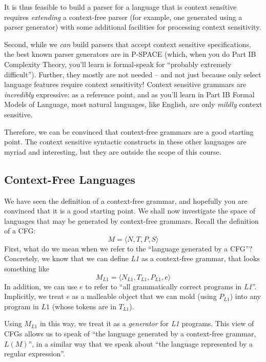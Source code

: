 It is thus feasible to build a parser for a language that is context sensitive requires \textit{extending} a context-free parser (for example, one generated using a parser generator) with some additional facilities for processing context sensitivity. 

Second, while we \textit{can} build parsers that accept context sensitive specifications, the best known parser generators are in \textsf{P-SPACE} (which, when you do \textsf{Part IB Complexity Theory}, you'll learn is formal-speak for ``probably extremely difficult''). Further, they mostly are not needed -- and not just because only select language features require context sensitivity! Context sensitive grammars are \textit{incredibly} expressive: as a reference point, and as you'll learn in \textsf{Part IB Formal Models of Language}, most natural languages, like English, are only \textit{mildly} context sensitive.

Therefore, we can be convinced that context-free grammars are a good starting point. The context sensitive syntactic constructs in these other languages are myriad and interesting, but they are outside the scope of this course.

\subsection{Context-Free Languages}\label{section:cfg-properties}
We have seen the definition of a context-free grammar, and hopefully you are convinced that it is a good starting point. We shall now investigate the space of languages that may be generated by context-free grammars. Recall the definition of a CFG:
\[ M = \langle N, T, P, S \rangle \]
First, what do we mean when we refer to the ``language generated by a CFG''? Concretely, we know that we can define \textit{L1} as a context-free grammar, that looks something like
\[ M_{\textit{L1}} = \langle N_{\textit{L1}}, T_{\textit{L1}}, P_{\textit{L1}}, e \rangle \]
In addition, we can use $e$ to refer to ``all grammatically correct programs in \textit{L1}''. Implicitly, we treat $e$ as a malleable object that we can mold (using $P_{\textit{L1}}$) into any program in $L1$ (whose tokens are in $T_{\textit{L1}}$). 

Using $M_\textit{L1}$ in this way, we treat it as a \textit{generator} for \textit{L1} programs. This view of CFGs allows us to speak of ``the language generated by a context-free grammar, $L(M)$'', in a similar way that we speak about ``the language represented by a regular expression''.

